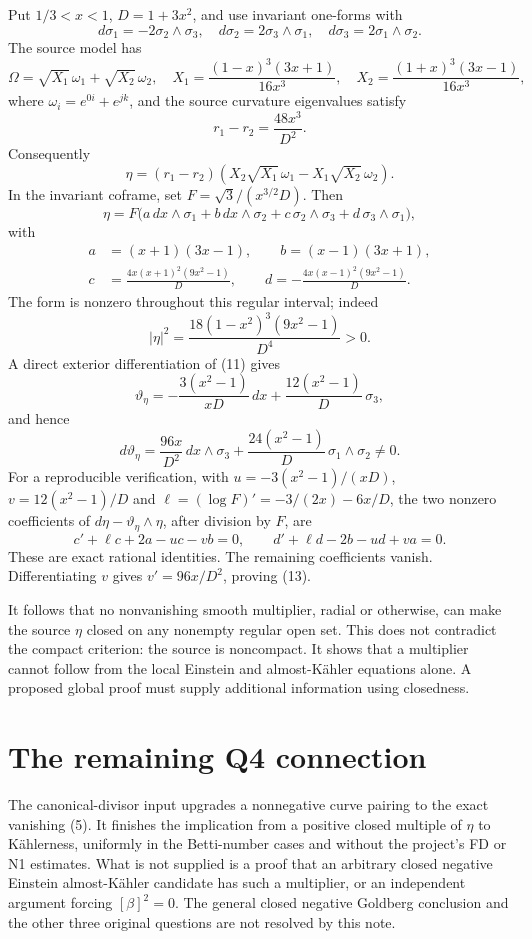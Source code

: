 \documentclass[11pt]{article}
\theoremstyle{remark}
\newcommand{\Om}{\Omega}
\begin{document}
Put \(1/3<x<1\), \(D=1+3x^2\), and use invariant one-forms with
\[
 d\sigma_1=-2\sigma_2\wedge\sigma_3,\quad
 d\sigma_2=2\sigma_3\wedge\sigma_1,\quad
 d\sigma_3=2\sigma_1\wedge\sigma_2.
\]
The source model has
\[
 \Om=\sqrt{X_1}\,\omega_1+\sqrt{X_2}\,\omega_2,\quad
 X_1=\frac{(1-x)^3(3x+1)}{16x^3},\quad
 X_2=\frac{(1+x)^3(3x-1)}{16x^3},
\]
where \(\omega_i=e^{0i}+e^{jk}\), and the source curvature eigenvalues satisfy
\[
 r_1-r_2=\frac{48x^3}{D^2}.
\]
Consequently
\[
 \eta=(r_1-r_2)
 \left(X_2\sqrt{X_1}\,\omega_1-X_1\sqrt{X_2}\,\omega_2\right).
 \tag{10}
\]
In the invariant coframe, set \(F=\sqrt3/(x^{3/2}D)\). Then
\[
 \eta=F\bigl(a\,dx\wedge\sigma_1+b\,dx\wedge\sigma_2
              +c\,\sigma_2\wedge\sigma_3+d\,\sigma_3\wedge\sigma_1\bigr),
 \tag{11}
\]
with
\[
 \begin{split}
 a&=(x+1)(3x-1),\qquad b=(x-1)(3x+1),\\
 c&=\frac{4x(x+1)^2(9x^2-1)}D,\qquad
 d=-\frac{4x(x-1)^2(9x^2-1)}D.
 \end{split}
\]
The form is nonzero throughout this regular interval; indeed
\[
 |\eta|^2=\frac{18(1-x^2)^3(9x^2-1)}{D^4}>0.
\]
A direct exterior differentiation of (11) gives
\[
 \boxed{
 \vartheta_\eta=
 -\frac{3(x^2-1)}{xD}\,dx+\frac{12(x^2-1)}D\,\sigma_3,
 }\tag{12}
\]
and hence
\[
 \boxed{
 d\vartheta_\eta=
 \frac{96x}{D^2}\,dx\wedge\sigma_3+
 \frac{24(x^2-1)}D\,\sigma_1\wedge\sigma_2\ne0.
 }\tag{13}
\]
For a reproducible verification, with
\(u=-3(x^2-1)/(xD)\), \(v=12(x^2-1)/D\) and
\(\ell=(\log F)'=-3/(2x)-6x/D\), the two nonzero coefficients of
\(d\eta-\vartheta_\eta\wedge\eta\), after division by \(F\), are
\[
 c'+\ell c+2a-uc-vb=0,\qquad
 d'+\ell d-2b-ud+va=0.
\]
These are exact rational identities. The remaining coefficients vanish.
Differentiating \(v\) gives \(v'=96x/D^2\), proving (13).

It follows that no nonvanishing smooth multiplier, radial or otherwise,
can make the source \(\eta\) closed on any nonempty regular open set.
This does not contradict the compact criterion: the source is noncompact.
It shows that a multiplier cannot follow from the local Einstein and
almost-K\"ahler equations alone. A proposed global proof must supply
additional information using closedness.

\section{The remaining Q4 connection}
The canonical-divisor input upgrades a nonnegative curve pairing to the
exact vanishing (5). It finishes the implication from a positive
closed multiple of \(\eta\) to K\"ahlerness, uniformly in the Betti-number
cases and without the project's FD or N1 estimates.
What is not supplied is a proof that an arbitrary closed negative
Einstein almost-K\"ahler candidate has such a multiplier, or an independent
argument forcing \([\beta]^2=0\).
The general closed negative Goldberg conclusion and the other three
original questions are not resolved by this note.
\end{document}
